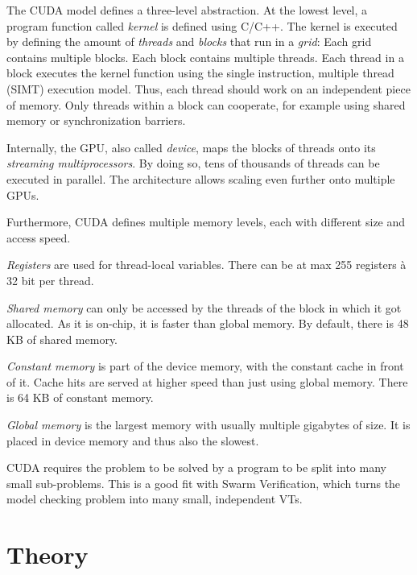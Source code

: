 \documentclass[
fancyheadings, %
%
%
]{stsreprt}
\begin{document}
The CUDA model defines a three-level abstraction.
At the lowest level, a program function called \emph{kernel} is defined using C/C++.
The kernel is executed by defining the amount of \emph{threads} and \emph{blocks} that run in a \emph{grid}:
Each grid contains multiple blocks.
Each block contains multiple threads.
Each thread in a block executes the kernel function using the single instruction, multiple thread (SIMT) execution model.
Thus, each thread should work on an independent piece of memory.
Only threads within a block can cooperate, for example using shared memory or synchronization barriers.

Internally, the GPU, also called \emph{device}, maps the blocks of threads onto its \emph{streaming multiprocessors}.
By doing so, tens of thousands of threads can be executed in parallel.
The architecture allows scaling even further onto multiple GPUs.

Furthermore, CUDA defines multiple memory levels, each with different size and access speed.

\emph{Registers} are used for thread-local variables.
There can be at max 255 registers à 32 bit per thread.


\emph{Shared memory} can only be accessed by the threads of the block in which it got allocated.
As it is on-chip, it is faster than global memory.
By default, there is 48 KB of shared memory.

\emph{Constant memory} is part of the device memory, with the constant cache in front of it.
Cache hits are served at higher speed than just using global memory.
There is 64 KB of constant memory.


\emph{Global memory} is the largest memory with usually multiple gigabytes of size.
It is placed in device memory and thus also the slowest.

CUDA requires the problem to be solved by a program to be split into many small sub-problems.
This is a good fit with Swarm Verification, which turns the model checking problem into many small, independent VTs.



\chapter{Theory}
\label{chapter:theory}
\end{document}
